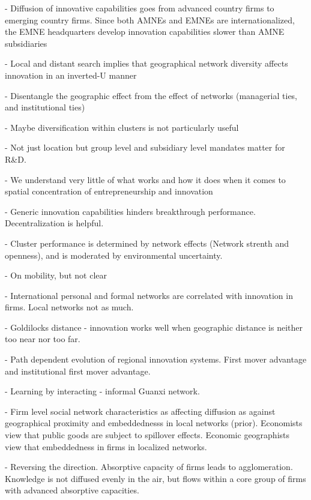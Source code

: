 \documentclass[12pt]{article}
\begin{document}
\cite{Awate2015} - Diffusion of innovative capabilities goes from advanced country firms to emerging country firms. Since both AMNEs and EMNEs are internationalized, the EMNE headquarters develop innovation capabilities slower than AMNE subsidiaries

\cite{Bahlman2014} - Local and distant search implies that geographical network diversity affects innovation in an inverted-U manner

\cite{Bell2005} - Disentangle the geographic effect from the effect of networks (managerial ties, and institutional ties)

\cite{Baptista1998} - Maybe diversification within clusters is not particularly useful

\cite{Cantwell2005} - Not just location but group level and subsidiary level mandates matter for R\&D.

\cite{Chatterji2013} - We understand very little of what works and how it does when it comes to spatial concentration of entrepreneurship and innovation

\cite{Dunlap-Hinkler2010} - Generic innovation capabilities hinders breakthrough performance. Decentralization is helpful.

\cite{Eisengerich2010} - Cluster performance is determined by network effects (Network strenth and openness), and is moderated by environmental uncertainty.

\cite{Eriksson2011} - On mobility, but not clear

\cite{Fitjar2015} - International personal and formal networks are correlated with innovation in firms. Local networks not as much. 

\cite{Fitjar2016} - Goldilocks distance - innovation works well when geographic distance is neither too near nor too far.

\cite{Fu2012} - Path dependent evolution of regional innovation systems. First mover advantage and institutional first mover advantage.

\cite{Fu2013} - Learning by interacting - informal Guanxi network.

\cite{Giuliani2007} - Firm level social network characteristics as affecting diffusion as against geographical proximity and embeddednesss in local networks (prior). Economists view that public goods are subject to spillover effects. Economic geographists view that embeddedness in firms in localized networks.

\cite{Giuliani2005} - Reversing the direction. Absorptive capacity of firms leads to agglomeration.  Knowledge is not diffused evenly in the air, but flows within a core group of firms with advanced absorptive capacities.
\end{document}
